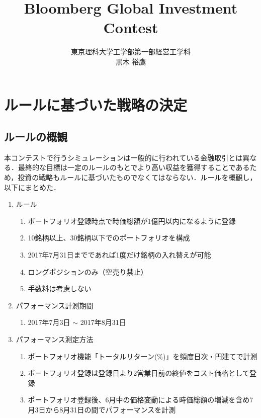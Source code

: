 \documentclass[11pt]{jreport}
\begin{document}
\title{Bloomberg Global Investment Contest\\}
\author{東京理科大学工学部第一部経営工学科\\黒木 裕鷹}
\maketitle
\begin{abstract}

\end{abstract}


\chapter{ルールに基づいた戦略の決定}
\section{ルールの概観}

本コンテストで行うシミュレーションは一般的に行われている金融取引とは異なる．最終的な目標は一定のルールのもとでより高い収益を獲得することであるため，投資の戦略もルールに基づいたものでなくてはならない．ルールを概観し，以下にまとめた．

\begin{enumerate}
\item ルール
\begin{enumerate}
\item ポートフォリオ登録時点で時価総額が1億円以内になるように登録
\item 10銘柄以上、30銘柄以下でのポートフォリオを構成
\item 2017年7月31日までであれば1度だけ銘柄の入れ替えが可能
\item ロングポジションのみ（空売り禁止）
\item 手数料は考慮しない
\end{enumerate}

\item パフォーマンス計測期間
\begin{enumerate}
\item  2017年7月3日 $\sim$ 2017年8月31日
\end{enumerate}

\item パフォーマンス測定方法
\begin{enumerate}
\item ポートフォリオ機能「トータルリターン(\%)」を頻度日次・円建てで計測
\item ポートフォリオ登録は登録日より2営業日前の終値をコスト価格として登録
\item ポートフォリオ登録後、6月中の価格変動による時価総額の増減を含め7月3日から8月31日の間でパフォーマンスを計測
\end{enumerate}
\end{enumerate}
\end{document}
